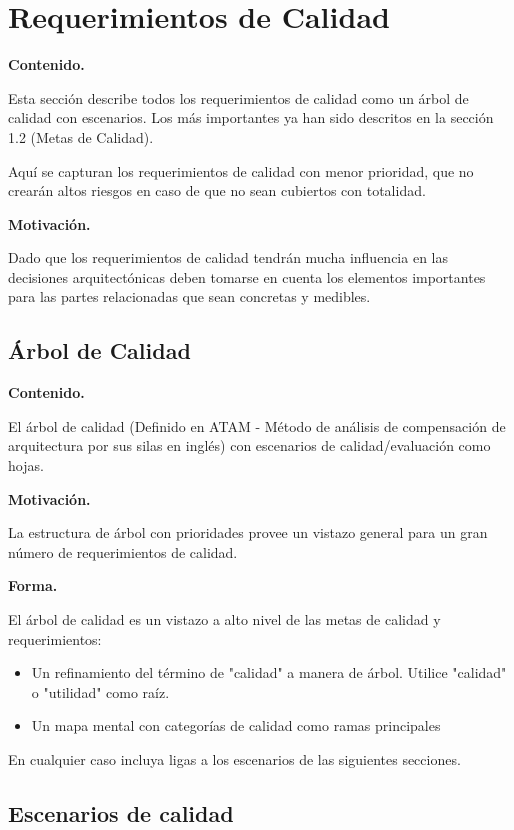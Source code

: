 \documentclass[]{article}
\begin{document}
\hypertarget{section-quality-scenarios}{%
\section{Requerimientos de Calidad}\label{section-quality-scenarios}}

\textbf{Contenido.}

Esta sección describe todos los requerimientos de calidad como un árbol
de calidad con escenarios. Los más importantes ya han sido descritos en
la sección 1.2 (Metas de Calidad).

Aquí se capturan los requerimientos de calidad con menor prioridad, que
no crearán altos riesgos en caso de que no sean cubiertos con totalidad.

\textbf{Motivación.}

Dado que los requerimientos de calidad tendrán mucha influencia en las
decisiones arquitectónicas deben tomarse en cuenta los elementos
importantes para las partes relacionadas que sean concretas y medibles.

\hypertarget{__rbol_de_calidad}{%
\subsection{Árbol de Calidad}\label{__rbol_de_calidad}}

\textbf{Contenido.}

El árbol de calidad (Definido en ATAM - Método de análisis de
compensación de arquitectura por sus silas en inglés) con escenarios de
calidad/evaluación como hojas.

\textbf{Motivación.}

La estructura de árbol con prioridades provee un vistazo general para un
gran número de requerimientos de calidad.

\textbf{Forma.}

El árbol de calidad es un vistazo a alto nivel de las metas de calidad y
requerimientos:

\begin{itemize}
\item
  Un refinamiento del término de "calidad" a manera de árbol. Utilice
  "calidad" o "utilidad" como raíz.
\item
  Un mapa mental con categorías de calidad como ramas principales
\end{itemize}

En cualquier caso incluya ligas a los escenarios de las siguientes
secciones.

\hypertarget{_escenarios_de_calidad}{%
\subsection{Escenarios de calidad}\label{_escenarios_de_calidad}}
\end{document}
